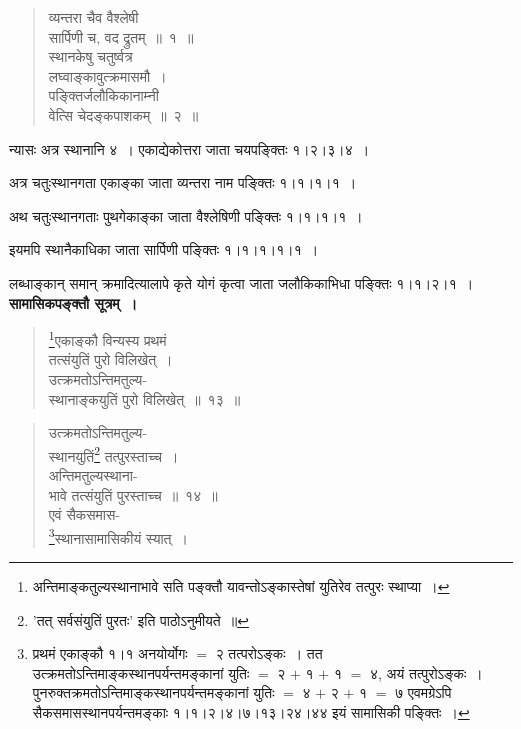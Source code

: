 \documentclass[11pt, openany]{book}
\begin{document}
\newpage 	

\begin{quote}
{\ex व्यन्तरा चैव वैश्लेषी\\
सार्पिणी च, वद द्रुतम्~॥~१~॥\\
स्थानकेषु चतुर्ष्वत्र\\
लघ्वाङ्कावुत्क्रमासमौ~।\\
पङ्क्तिर्जलौकिकानाम्नी\\
वेत्सि चेदङ्कपाशकम्~॥~२~॥}
\end{quote}

न्यासः अत्र स्थानानि ४~। एकाद्येकोत्तरा जाता चयपङ्क्तिः १।२।३।४~।
\vspace{2mm}

अत्र चतुःस्थानगता एकाङ्का जाता व्यन्तरा नाम पङ्क्तिः १।१।१।१~।
\vspace{2mm}

अथ चतुःस्थानगताः पुथगेकाङ्का जाता वैश्लेषिणी पङ्क्तिः १।१।१।१~। 
\vspace{2mm}

इयमपि स्थानैकाधिका जाता सार्पिणी पङ्क्तिः १।१।१।१।१~। 
\vspace{2mm}

लब्धाङ्कान् समान् क्रमादित्यालापे कृते योगं कृत्वा जाता जलौकिकाभिधा पङ्क्तिः १।१।२।१~। \\

\textbf{सामासिकपङ्क्तौ सूत्रम्~।} 

\begin{quote}
\renewcommand{\thefootnote}{१}\footnote{अन्तिमाङ्कतुल्यस्थानाभावे सति पङ्क्तौ यावन्तोऽङ्कास्तेषां
युतिरेव तत्पुरः स्थाप्या~।}{\gk एकाङ्कौ विन्यस्य प्रथमं\\
तत्संयुतिं पुरो विलिखेत्~।\\
उत्क्रमतोऽन्तिमतुल्य-\\
स्थानाङ्कयुतिं पुरो विलिखेत्~॥~१३~॥}
\end{quote}

\newpage

\begin{quote}
{\gk उत्क्रमतोऽन्तिमतुल्य-\\
स्थानयुतिं\renewcommand{\thefootnote}{*}\footnote{'तत् सर्वसंयुतिं पुरतः' इति पाठोऽनुमीयते~॥} तत्पुरस्ताच्च~।\\
अन्तिमतुल्यस्थाना-\\
भावे तत्संयुतिं पुरस्ताच्च~॥~१४~॥\\
एवं सैकसमास-\\
\renewcommand{\thefootnote}{१}\footnote{प्रथमं एकाङ्कौ १।१ अनयोर्योगः $=$ २ तत्परोऽङ्कः~। तत उत्क्रमतोऽन्तिमाङ्कस्थानपर्यन्तमङ्कानां युतिः $=$ २ $+$ १ $+$ १ $=$ ४, अयं तत्पुरोऽङ्कः~। पुनरुक्तक्रमतोऽन्तिमाङ्कस्थानपर्यन्तमङ्कानां युतिः $=$ ४ $+$ २ $+$ १ $=$ ७ एवमग्रेऽपि सैकसमासस्थानपर्यन्तमङ्काः १।१।२।४।७।१३।२४।४४ इयं सामासिकी पङ्क्तिः~।}स्थानासामासिकीयं स्यात्~।	}
\end{quote}
\end{document}
